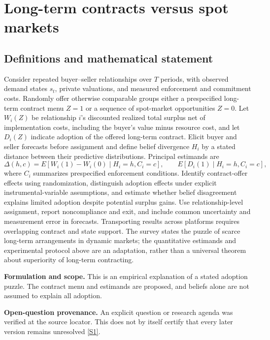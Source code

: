 \documentclass[11pt]{article}
\newcommand{\sref}[2]{\hyperlink{source:#1:#2}{[S#2]}}
\begin{document}
\section*{Long-term contracts versus spot markets}\label{30007575}
\subsection{Definitions and mathematical statement}
Consider repeated buyer–seller relationships over \(T\) periods, with observed demand states \(s_t\), private valuations, and measured enforcement and commitment costs. Randomly offer otherwise comparable groups either a prespecified long-term contract menu \(Z=1\) or a sequence of spot-market opportunities \(Z=0\). Let \(W_i(Z)\) be relationship \(i\)'s discounted realized total surplus net of implementation costs, including the buyer's value minus resource cost, and let \(D_i(Z)\) indicate adoption of the offered long-term contract. Elicit buyer and seller forecasts before assignment and define belief divergence \(H_i\) by a stated distance between their predictive distributions. Principal estimands are
\[
 \Delta(h,c)=E[W_i(1)-W_i(0)\mid H_i=h,C_i=c],
 \qquad E[D_i(1)\mid H_i=h,C_i=c],
\]
where \(C_i\) summarizes prespecified enforcement conditions. Identify contract-offer effects using randomization, distinguish adoption effects under explicit instrumental-variable assumptions, and estimate whether belief disagreement explains limited adoption despite potential surplus gains. Use relationship-level assignment, report noncompliance and exit, and include common uncertainty and measurement error in forecasts. Transporting results across platforms requires overlapping contract and state support. The survey states the puzzle of scarce long-term arrangements in dynamic markets; the quantitative estimands and experimental protocol above are an adaptation, rather than a universal theorem about superiority of long-term contracting.

\par\textbf{Formulation and scope.} This is an empirical explanation of a stated adoption puzzle. The contract menu and estimands are proposed, and beliefs alone are not assumed to explain all adoption.

\par\textbf{Open-question provenance.} An explicit question or research agenda was verified at the source locator. This does not by itself certify that every later version remains unresolved \sref{30007575}{1}.
\end{document}
